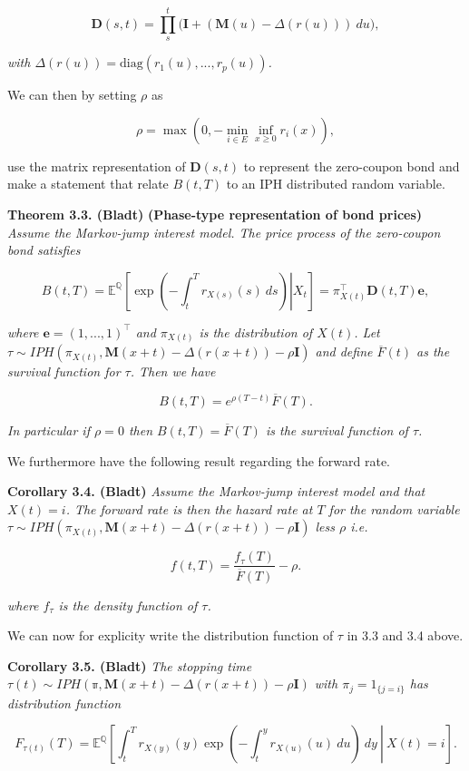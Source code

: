 \documentclass[a4paper,10pt,openany]{book}
\begin{document}
\[
\mathbf D(s,t)=\prod_s^t\Big(\mathbf I+(\mathbf M(u)-\Delta (r(u)))\ du\Big),
\]

\emph{with \(\Delta(r(u))=\text{diag}(r_1(u),...,r_p(u))\).}

We can then by setting \(\rho\) as

\[
\rho=\max\left(0,-\min_{i\in E}\inf_{x\ge 0}r_i(x)\right),
\]

use the matrix representation of \(\mathbf D(s,t)\) to represent the zero-coupon bond and make a statement that relate \(B(t,T)\) to an IPH distributed random variable.

\textbf{Theorem 3.3. (Bladt)} \textbf{(Phase-type representation of bond prices)} \emph{Assume the Markov-jump interest model. The price process of the zero-coupon bond satisfies}

\[
B(t,T)=\mathbb E^{\mathbb Q}\left[\left.\exp\left(-\int_t^Tr_{X(s)}(s)\ ds\right) \right\vert X_t\right]=\pi_{X(t)}^\top\mathbf D(t,T)\mathbf e,
\]

\emph{where \(\mathbf e=(1,...,1)^\top\) and \(\pi_{X(t)}\) is the distribution of \(X(t)\). Let \(\tau\sim IPH(\pi_{X(t)},\mathbf M(x+t)-\Delta (r(x+t))-\rho \mathbf I)\) and define \(\overline F(t)\) as the survival function for \(\tau\). Then we have}

\[
B(t,T)=e^{\rho (T-t)}\overline F(T).
\]

\emph{In particular if \(\rho = 0\) then \(B(t,T)=\overline F(T)\) is the survival function of \(\tau\).}

We furthermore have the following result regarding the forward rate.

\textbf{Corollary 3.4. (Bladt)} \emph{Assume the Markov-jump interest model and that \(X(t)=i\). The forward rate is then the hazard rate at \(T\) for the random variable \(\tau\sim IPH(\pi_{X(t)},\mathbf M(x+t)-\Delta (r(x+t))-\rho \mathbf I)\) less \(\rho\) i.e.}

\[
f(t,T)=\frac{f_{\tau}(T)}{\overline F(T)}-\rho.
\]

\emph{where \(f_\tau\) is the density function of \(\tau\).}

We can now for explicity write the distribution function of \(\tau\) in 3.3 and 3.4 above.

\textbf{Corollary 3.5. (Bladt)} \emph{The stopping time \(\tau(t)\sim IPH(\mathbb \pi,\mathbf M(x+t)-\Delta (r(x+t))-\rho \mathbf I)\) with \(\pi_j=1_{\{j=i\}}\) has distribution function}

\[
F_{\tau(t)}(T)=\mathbb E^{\mathbb Q}\left[\left.\int_t^T r_{X(y)}(y)\exp\left(-\int_t^yr_{X(u)}(u)\ du\right)\ dy\ \right\vert\ X(t)=i\right].
\]
\end{document}
